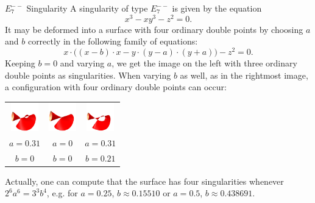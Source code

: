 \begin{surferPage}[E7-- Singularity]{$E_7^{--}$ Singularity}
	A singularity of type $E_7^{--}$ is given by the equation
	\[
		x^3-xy^3-z^2=0.
	\]
	It may be deformed into a surface with four ordinary double points by choosing $a$ and $b$ correctly in the following family of equations:
	\[
		x\cdot\bigl((x-b)\cdot x-y\cdot(y-a)\cdot (y+a)\bigr)-z^2=0.
	\]
	Keeping $b=0$ and varying $a$, we get the image on the left with three ordinary double points as singularities. When varying $b$ as well, as in the rightmost image, a configuration with four ordinary double points can occur:
	\vspace{-1.5ex}
	\begin{center}
		\begin{tabular}{c@{\quad}c@{\quad}c}
			\includegraphics[width=1.2cm]{../../common/images/E7mm_1} &
			\includegraphics[width=1.2cm]{../../common/images/E7mm_0} &
			\includegraphics[width=1.2cm]{../../common/images/E7mm_2}\\
			$a=0.31$ &
			$a=0$ &
			$a=0.31$\\
			$b=0$ &
			$b=0$ &
			$b=0.21$
		\end{tabular}
	\end{center}
	Actually, one can compute that the surface has four singularities whenever $2^{6}a^{6}=3^3b^4$, e.g. for $a=0.25$, $b\approx 0.15510$ or $a=0.5$, $b\approx 0.438691$.
\end{surferPage}
